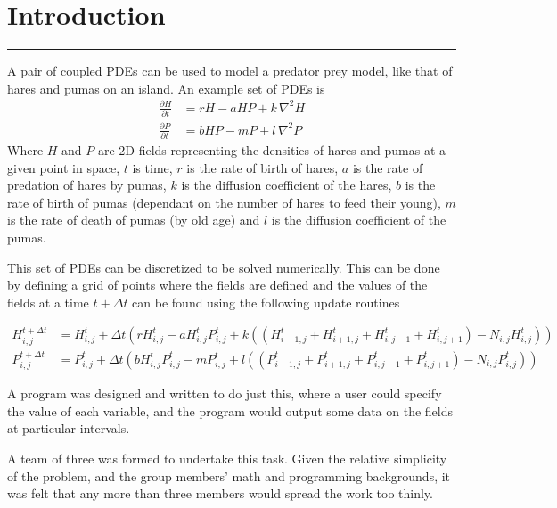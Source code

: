 \section{Introduction}
\vspace{-2em}\rule{\textwidth}{1pt}\vspace{1em}

A pair of coupled PDEs can be used to model a predator prey model, like
that of hares and pumas on an island.
An example set of PDEs is
\begin{align*}
  \frac{\partial{H}}{\partial{t}} &= rH - aHP + k\,{\nabla^2}H \\
  \frac{\partial{P}}{\partial{t}} &= bHP - mP + l\,{\nabla^2}P
\end{align*}
Where $H$ and $P$ are 2D fields representing the densities of hares and pumas
at a given point in space,
$t$ is time,
$r$ is the rate of birth of hares,
$a$ is the rate of predation of hares by pumas,
$k$ is the diffusion coefficient of the hares,
$b$ is the rate of birth of pumas (dependant on the number of hares to
    feed their young),
$m$ is the rate of death of pumas (by old age) and
$l$ is the diffusion coefficient of the pumas.

This set of PDEs can be discretized to be solved numerically.
This can be done by defining a grid of points where the fields are
defined and the values of the fields at a time $t + \Delta{t}$ can
be found using the following update routines

\begin{align*}
  H^{t+\Delta{t}}_{i,j} &= H^{t}_{i,j}
       + \Delta{t}(
           rH^{t}_{i,j} - a H^{t}_{i,j} P^{t}_{i,j}
           + k (
             (H^{t}_{i-1,j} + H^{t}_{i+1,j} + H^{t}_{i,j-1} + H^{t}_{i,j+1})
             -N_{i,j} H^{t}_{i,j}
           )
         ) \\
%
  P^{t+\Delta{t}}_{i,j} &= P^{t}_{i,j}
       + \Delta{t}(
           b H^{t}_{i,j} P^{t}_{i,j} - mP^{t}_{i,j}
           + l (
             (P^{t}_{i-1,j} + P^{t}_{i+1,j} + P^{t}_{i,j-1} + P^{t}_{i,j+1})
             -N_{i,j} P^{t}_{i,j}
           )
         )
\end{align*}

A program was designed and written to do just this, where a user could
specify the value of each variable, and the program would output some
data on the fields at particular intervals.

A team of three was formed to undertake this task.
Given the relative simplicity of the problem, and the group members'
math and programming backgrounds, it was felt that any more than three
members would spread the work too thinly.
